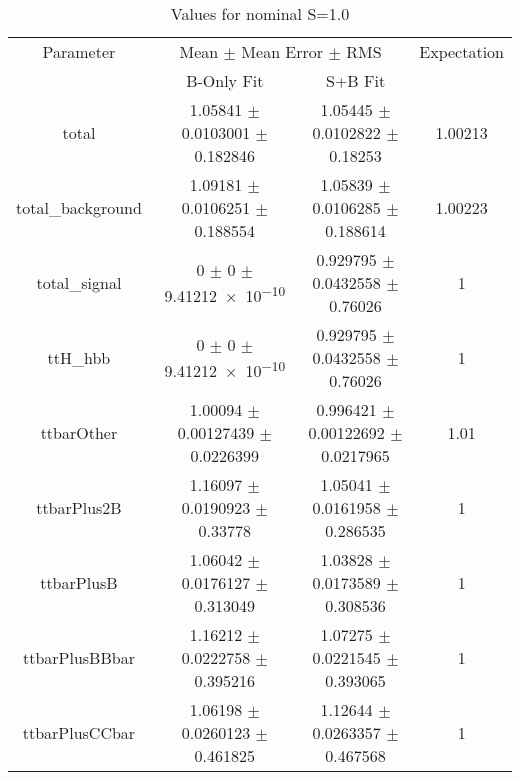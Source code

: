 \begin{table}
\centering
\caption{Values for nominal S=1.0}
\begin{tabular}{cccc}
\toprule
Parameter & \multicolumn{2}{c}{Mean $\pm$ Mean Error $\pm$ RMS} & Expectation\\
 & B-Only Fit & S+B Fit & \\
\midrule
total & \num{1.05841} $\pm$ \num{0.0103001} $\pm$ \num{0.182846} & \num{1.05445} $\pm$ \num{0.0102822} $\pm$ \num{0.18253} & \num{1.00213}\\
total\_background & \num{1.09181} $\pm$ \num{0.0106251} $\pm$ \num{0.188554} & \num{1.05839} $\pm$ \num{0.0106285} $\pm$ \num{0.188614} & \num{1.00223}\\
total\_signal & \num{0} $\pm$ \num{0} $\pm$ \num{9.41212e-10} & \num{0.929795} $\pm$ \num{0.0432558} $\pm$ \num{0.76026} & \num{1}\\
ttH\_hbb & \num{0} $\pm$ \num{0} $\pm$ \num{9.41212e-10} & \num{0.929795} $\pm$ \num{0.0432558} $\pm$ \num{0.76026} & \num{1}\\
ttbarOther & \num{1.00094} $\pm$ \num{0.00127439} $\pm$ \num{0.0226399} & \num{0.996421} $\pm$ \num{0.00122692} $\pm$ \num{0.0217965} & \num{1.01}\\
ttbarPlus2B & \num{1.16097} $\pm$ \num{0.0190923} $\pm$ \num{0.33778} & \num{1.05041} $\pm$ \num{0.0161958} $\pm$ \num{0.286535} & \num{1}\\
ttbarPlusB & \num{1.06042} $\pm$ \num{0.0176127} $\pm$ \num{0.313049} & \num{1.03828} $\pm$ \num{0.0173589} $\pm$ \num{0.308536} & \num{1}\\
ttbarPlusBBbar & \num{1.16212} $\pm$ \num{0.0222758} $\pm$ \num{0.395216} & \num{1.07275} $\pm$ \num{0.0221545} $\pm$ \num{0.393065} & \num{1}\\
ttbarPlusCCbar & \num{1.06198} $\pm$ \num{0.0260123} $\pm$ \num{0.461825} & \num{1.12644} $\pm$ \num{0.0263357} $\pm$ \num{0.467568} & \num{1}\\
\bottomrule
\end{tabular}
\end{table}